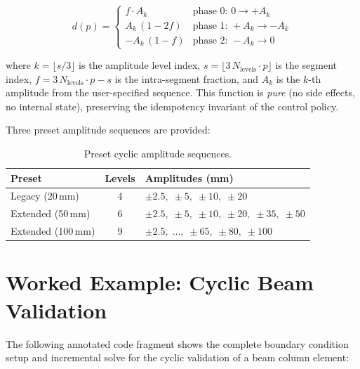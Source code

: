 \begin{equation}
  d(p) = \begin{cases}
    f \cdot A_k           & \text{phase 0: } 0 \to +A_k \\
    A_k\,(1 - 2f)         & \text{phase 1: } +A_k \to -A_k \\
    -A_k\,(1 - f)          & \text{phase 2: } -A_k \to 0
  \end{cases}
  \label{eq:cyclic-displacement}
\end{equation}

where $k = \lfloor s / 3 \rfloor$ is the amplitude level index,
$s = \lfloor 3\,N_{\text{levels}} \cdot p \rfloor$ is the segment
index, $f = 3\,N_{\text{levels}} \cdot p - s$ is the intra-segment
fraction, and $A_k$ is the $k$-th amplitude from the user-specified
sequence.  This function is \emph{pure} (no side effects, no internal
state), preserving the idempotency invariant of the control policy.

Three preset amplitude sequences are provided:

\begin{table}[htbp]
\centering
\caption{Preset cyclic amplitude sequences.}
\label{tab:cyclic-amplitudes}
\begin{tabular}{@{}lcl@{}}
\toprule
\textbf{Preset} & \textbf{Levels} & \textbf{Amplitudes (mm)} \\
\midrule
Legacy (20\,mm)     & 4 & $\pm 2.5,\; \pm 5,\; \pm 10,\; \pm 20$ \\
Extended (50\,mm)   & 6 & $\pm 2.5,\; \pm 5,\; \pm 10,\; \pm 20,\; \pm 35,\; \pm 50$ \\
Extended (100\,mm)  & 9 & $\pm 2.5,\; \ldots,\; \pm 65,\; \pm 80,\; \pm 100$ \\
\bottomrule
\end{tabular}
\end{table}


\section{Worked Example: Cyclic Beam Validation}
\label{sec:worked-example-cyclic}

The following annotated code fragment shows the complete boundary
condition setup and incremental solve for the cyclic validation
of a beam column element:

